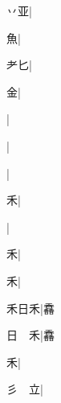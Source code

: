 \begin{multicols}{2}
{{\cjk{}{\cnsym{}　}丷亚}|{}\par
{\cjk{}{\cnsym{}　}{\cnsym{}　}魚}|{}\par
{\cjk{}{\cnsym{}　}耂匕}|{}\par
{\cjk{}{\cnsym{}　}{\cnsym{}　}金}|{}\par
{\cjk{}{\cnsym{}　}{\cnsym{}　}{\cnsym{}　}}|{}\par
{\cjk{}{\cnsym{}　}{\cnsym{}　}{\cnsym{}　}}|{}\par
{\cjk{}{\cnsym{}　}{\cnsym{}　}{\cnsym{}　}}|{}\par
{\cjk{}{\cnsym{}　}{\cnsym{}　}禾}|{}\par
{\cjk{}{\cnsym{}　}{\cnsym{}　}{\cnsym{}　}}|{}\par
{\cjk{}{\cnsym{}　}{\cnsym{}　}禾}|{}\par
{\cjk{}{\cnsym{}　}{\cnsym{}　}禾}|{}\par
{\cjk{}禾日禾}|{\cjk{}馫}\par
{\cjk{}日{\cnsym{}　}禾}|{\cjk{}馫}\par
{\cjk{}{\cnsym{}　}{\cnsym{}　}禾}|{}\par
{\cjk{}彡{\cnsym{}　}立}|{}\par
}
\end{multicols}
